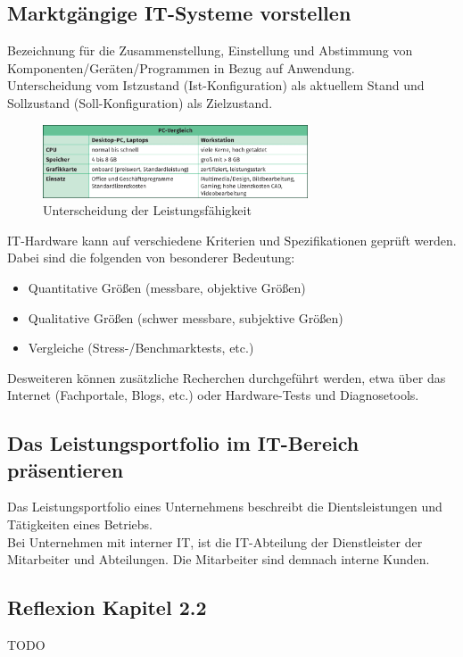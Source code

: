 \subsection{Marktgängige IT-Systeme vorstellen}
    \begin{tcolorbox}[width=15cm, center, title=Konfiguration, coltitle=white, colframe=orange, colback=white!60!orange]
        Bezeichnung für die Zusammenstellung, Einstellung und Abstimmung von Komponenten/Geräten/Programmen in Bezug auf Anwendung. \\
        Unterscheidung vom Istzustand (Ist-Konfiguration) als aktuellem Stand und Sollzustand (Soll-Konfiguration) als Zielzustand.
    \end{tcolorbox}
    \vspace{-1em}
    \begin{figure}[h]
        \centering
        \includegraphics[width=0.7\textwidth]{./images/2.2.2_pc-vergleich.png}
        \caption{Unterscheidung der Leistungsfähigkeit}\label{fig:Leistungsfähigkeit_Unterscheidung}
    \end{figure}
    \begin{subindent}
        IT-Hardware kann auf verschiedene Kriterien und Spezifikationen geprüft werden. \\
        Dabei sind die folgenden von besonderer Bedeutung:
    \end{subindent}
    \begin{itemize}[leftmargin=2.5cm, topsep=0.3em, itemsep=0.1em, parsep=0.5em]
        \item Quantitative Größen (messbare, objektive Größen)
        \item Qualitative Größen (schwer messbare, subjektive Größen)
        \item Vergleiche (Stress-/Benchmarktests, etc.)
    \end{itemize}
    \begin{subindent}
        Desweiteren können zusätzliche Recherchen durchgeführt werden, etwa über das Internet (Fachportale, Blogs, etc.) oder Hardware-Tests und Diagnosetools.
    \end{subindent}
\subsection{Das Leistungsportfolio im IT-Bereich präsentieren}
    \begin{subindent}
        Das Leistungsportfolio eines Unternehmens beschreibt die Dientsleistungen und Tätigkeiten eines Betriebs. \\
        Bei Unternehmen mit interner IT, ist die IT-Abteilung der Dienstleister der Mitarbeiter und Abteilungen. Die Mitarbeiter sind demnach interne Kunden.
    \end{subindent}
\subsection*{Reflexion Kapitel 2.2}
    \begin{refindent}
        TODO
    \end{refindent}